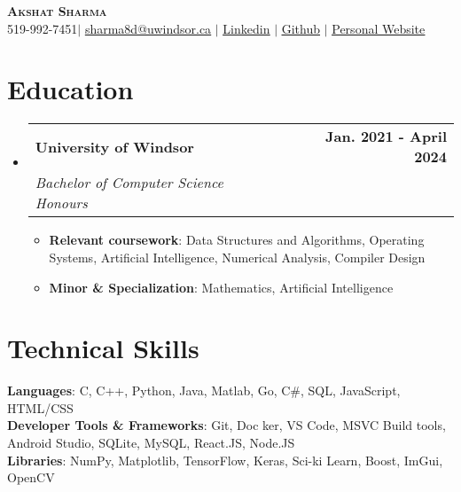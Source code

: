 \documentclass[letterpaper,11pt]{article}
\makeatletter
\newcommand{\resumeItem}[1]{
  \item\small{
    {#1 \vspace{-2pt}}
  }
}
\newcommand{\resumeSubheading}[4]{
  \vspace{-2pt}\item
    \begin{tabular*}{0.97\textwidth}[t]{l@{\extracolsep{\fill}}r}
      \textbf{#1} & #2 \\
      \textit{\small#3} & \textit{\small #4} \\
    \end{tabular*}\vspace{-7pt}
}
\newcommand{\resumeSubHeadingListStart}{\begin{itemize}[leftmargin=0.15in, label={}]}
\newcommand{\resumeSubHeadingListEnd}{\end{itemize}}
\newcommand{\resumeItemListStart}{\begin{itemize}}
\newcommand{\resumeItemListEnd}{\end{itemize}\vspace{-5pt}}
\makeatother
\begin{document}

\begin{center}
    \textbf{\Huge \scshape Akshat Sharma} \\ \vspace{1pt}
    \small 519-992-7451$|$ \href{mailto:sharma8d@uwindsor.ca}{\underline{sharma8d@uwindsor.ca}} $|$ 
    \href{https://www.linkedin.com/in/akshat8d/}{\underline{Linkedin}} $|$
    \href{https://github.com/Cyoger}{\underline{Github}} $|$
    \href{https://sharma8d.netlify.app}{\underline{Personal Website}}
\end{center}


\section{Education}
  \resumeSubHeadingListStart
    \resumeSubheading
      {University of Windsor}{\textbf{Jan. 2021 - April 2024}}
      {Bachelor of Computer Science Honours}{}
        \resumeItemListStart{}
          \resumeItem{\textbf{Relevant coursework}: Data Structures and Algorithms, Operating Systems, Artificial Intelligence, Numerical Analysis, Compiler Design}
          \resumeItem{\textbf{Minor \& Specialization}: Mathematics, Artificial Intelligence}
        \resumeItemListEnd
  \resumeSubHeadingListEnd

%
\section{Technical Skills}
 \begin{itemize}[leftmargin=0.15in, label={}]
    \small{\item{
     \textbf{Languages}{: C, C++, Python, Java, Matlab, Go, C\#, SQL, JavaScript, HTML/CSS} \\
     \textbf{Developer Tools \& Frameworks}{: Git, Doc  ker, VS Code, MSVC Build tools, Android Studio, SQLite, MySQL, React.JS, Node.JS } \\
     \textbf{Libraries}{: NumPy, Matplotlib, TensorFlow, Keras, Sci-ki Learn, Boost, ImGui, OpenCV}
    }}
 \end{itemize}
\end{document}
